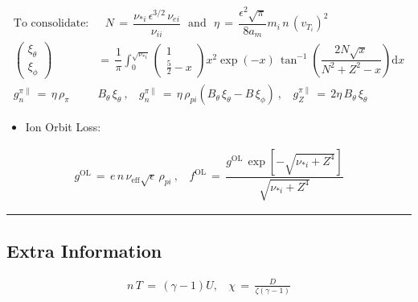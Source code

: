 \documentclass[a4paper,8pt]{article}
\providecommand{\tightlist}{%
  \setlength{\itemsep}{0pt}\setlength{\parskip}{0pt}}
\begin{document}
\begin{align}
    \text{To consolidate:}&~~~ N \,=\, \dfrac{\nu_{*i}\,\epsilon^{3/2}\,\nu_{ei}}{\nu_{ii}} ~~~\text{and}~~~ \eta \,=\, \dfrac{\epsilon^2 \sqrt{\pi}}{8 a_m} m_i \,n\, (v_{T_i})^2 \\
    \begin{pmatrix}\xi_\theta \\[1ex] \xi_\phi \end{pmatrix} \,&=\, \dfrac{1}{\pi} \int_0^{\sqrt{\nu_{*i}}} \begin{pmatrix} 1 \\ \frac{5}{2} - x \end{pmatrix} x^2 \exp(-x) \, \tan^{-1}\left(\dfrac{2 N \sqrt{x}}{N^2 + Z^2 - x}\right) \text{d}x \\
    g_n^{\pi\parallel} \,=\, \eta \, \rho_{\pi}& B_\theta \, \xi_\theta~,~~~~ g_n^{\pi\parallel} \,=\, \eta \, \rho_{pi} \left(B_\theta\,\xi_\theta - B\,\xi_\phi\right)~,~~~~ g_Z^{\pi\parallel} \,=\, 2\eta \, B_\theta \, \xi_\theta
\end{align}

\begin{itemize}
\tightlist
\item
  Ion Orbit Loss:
\end{itemize}

\begin{align}
    g^\text{OL} \,=\, e \,n\, \nu_\text{eff} \sqrt{\epsilon} \,\rho_{pi}~,~~~~ f^\text{OL} \,=\, \dfrac{g^\text{OL}\,\exp\left[-\sqrt{\nu_{*i} + Z^4}\right]}{\sqrt{\nu_{*i} + Z^4}}
\end{align}

\begin{center}\rule{0.5\linewidth}{\linethickness}\end{center}

\subsection{Extra Information}\label{extra-information}

\begin{align}
    n\,T \,=\, \left(\gamma - 1\right)U, ~~~~ \chi \,=\, \frac{D}{\zeta(\gamma - 1)}
\end{align}
\end{document}
